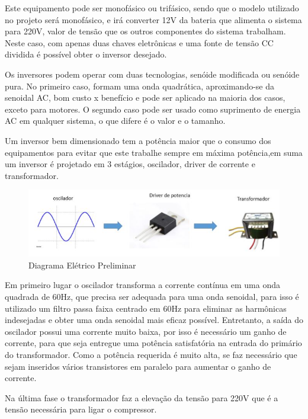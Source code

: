 Este equipamento pode ser monofásico ou trifásico, sendo que o modelo utilizado no projeto será monofásico, e irá converter 12V da bateria que alimenta o sistema para 220V, valor de tensão que os outros componentes do sistema trabalham. Neste caso, com apenas duas chaves eletrônicas e uma fonte de tensão CC dividida é possível obter o inversor desejado.

Os inversores podem operar com duas tecnologias, senóide modificada ou senóide pura. No primeiro caso, formam uma onda quadrática, aproximando-se da senoidal AC, bom custo x benefício e pode ser aplicado na maioria dos casos, exceto para motores. O segundo caso pode ser usado como suprimento de energia AC em qualquer sistema, o que difere é o valor e o tamanho.

Um inversor bem dimensionado tem a potência maior que o consumo dos equipamentos para evitar que este trabalhe sempre em máxima potência,em suma um inversor é projetado em 3 estágios, oscilador, driver de corrente e transformador.
\begin{figure}[H]
	\begin{center}
		\includegraphics[scale = 0.75]{figuras/dim_inversor.JPG}
		\caption{ Diagrama Elétrico Preliminar}
	\end{center}
\end{figure}

Em primeiro lugar o oscilador transforma a corrente contínua em uma onda quadrada de 60Hz, que precisa ser adequada para uma onda senoidal, para isso é utilizado um filtro passa faixa centrado em 60Hz para eliminar as harmônicas indesejadas e obter uma onda senoidal mais eficaz possível. Entretanto, a saída do oscilador possui uma corrente muito baixa, por isso é necessário um ganho de corrente, para que seja entregue uma potência satisfatória na entrada do primário do transformador. Como a potência requerida é muito alta, se faz necessário que sejam inseridos vários transistores em paralelo para aumentar o ganho de corrente.

Na última fase o transformador faz a elevação da tensão para 220V que é a tensão necessária para ligar o compressor.

